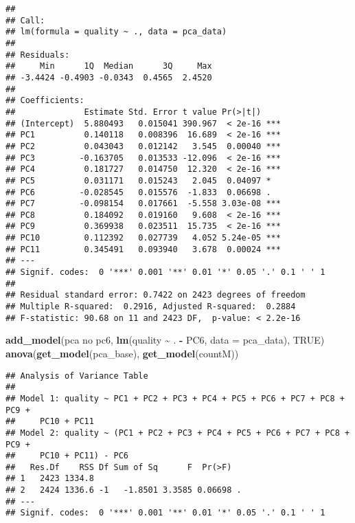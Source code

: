 \documentclass[
]{article}
\newenvironment{Shaded}{\begin{snugshade}}{\end{snugshade}}
\newcommand{\AttributeTok}[1]{\textcolor[rgb]{0.13,0.29,0.53}{#1}}
\newcommand{\ConstantTok}[1]{\textcolor[rgb]{0.56,0.35,0.01}{#1}}
\newcommand{\FunctionTok}[1]{\textcolor[rgb]{0.13,0.29,0.53}{\textbf{#1}}}
\newcommand{\NormalTok}[1]{#1}
\newcommand{\SpecialCharTok}[1]{\textcolor[rgb]{0.81,0.36,0.00}{\textbf{#1}}}
\newcommand{\StringTok}[1]{\textcolor[rgb]{0.31,0.60,0.02}{#1}}
\begin{document}
\begin{verbatim}
## 
## Call:
## lm(formula = quality ~ ., data = pca_data)
## 
## Residuals:
##     Min      1Q  Median      3Q     Max 
## -3.4424 -0.4903 -0.0343  0.4565  2.4520 
## 
## Coefficients:
##              Estimate Std. Error t value Pr(>|t|)    
## (Intercept)  5.880493   0.015041 390.967  < 2e-16 ***
## PC1          0.140118   0.008396  16.689  < 2e-16 ***
## PC2          0.043043   0.012142   3.545  0.00040 ***
## PC3         -0.163705   0.013533 -12.096  < 2e-16 ***
## PC4          0.181727   0.014750  12.320  < 2e-16 ***
## PC5          0.031171   0.015243   2.045  0.04097 *  
## PC6         -0.028545   0.015576  -1.833  0.06698 .  
## PC7         -0.098154   0.017661  -5.558 3.03e-08 ***
## PC8          0.184092   0.019160   9.608  < 2e-16 ***
## PC9          0.369938   0.023511  15.735  < 2e-16 ***
## PC10         0.112392   0.027739   4.052 5.24e-05 ***
## PC11         0.345491   0.093940   3.678  0.00024 ***
## ---
## Signif. codes:  0 '***' 0.001 '**' 0.01 '*' 0.05 '.' 0.1 ' ' 1
## 
## Residual standard error: 0.7422 on 2423 degrees of freedom
## Multiple R-squared:  0.2916, Adjusted R-squared:  0.2884 
## F-statistic: 90.68 on 11 and 2423 DF,  p-value: < 2.2e-16
\end{verbatim}

\begin{Shaded}
\begin{Highlighting}[]
\FunctionTok{add\_model}\NormalTok{(}\StringTok{\textquotesingle{}pca no pc6\textquotesingle{}}\NormalTok{, }\FunctionTok{lm}\NormalTok{(quality }\SpecialCharTok{\textasciitilde{}}\NormalTok{ . }\SpecialCharTok{{-}}\NormalTok{ PC6, }\AttributeTok{data =}\NormalTok{ pca\_data), }\ConstantTok{TRUE}\NormalTok{)}
\FunctionTok{anova}\NormalTok{(}\FunctionTok{get\_model}\NormalTok{(pca\_base), }\FunctionTok{get\_model}\NormalTok{(countM))}
\end{Highlighting}
\end{Shaded}

\begin{verbatim}
## Analysis of Variance Table
## 
## Model 1: quality ~ PC1 + PC2 + PC3 + PC4 + PC5 + PC6 + PC7 + PC8 + PC9 + 
##     PC10 + PC11
## Model 2: quality ~ (PC1 + PC2 + PC3 + PC4 + PC5 + PC6 + PC7 + PC8 + PC9 + 
##     PC10 + PC11) - PC6
##   Res.Df    RSS Df Sum of Sq      F  Pr(>F)  
## 1   2423 1334.8                              
## 2   2424 1336.6 -1   -1.8501 3.3585 0.06698 .
## ---
## Signif. codes:  0 '***' 0.001 '**' 0.01 '*' 0.05 '.' 0.1 ' ' 1
\end{verbatim}
\end{document}
